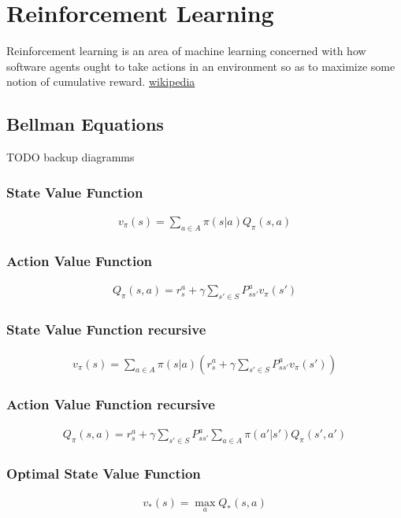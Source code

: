 \chapter{Reinforcement Learning}
Reinforcement learning is an area of machine learning concerned with how software agents ought to take actions in an environment so as to maximize some notion of cumulative reward.
\href{https://en.wikipedia.org/wiki/Reinforcement_learning}{wikipedia}

\section{Bellman Equations}
\newcommand{\qfunc}[2]{Q_\pi(#1, #2)}
\newcommand{\vfunc}[1]{v_\pi (#1)}
\newcommand{\policy}[2]{\pi (#1 | #2)}

TODO backup diagramms

\subsection{State Value Function}
\begin{align}
	\vfunc{s} = \sum_{a \in A} \policy{s}{a} \qfunc{s}{a}
\end{align}
\subsection{Action Value Function}
\begin{align}
	\qfunc{s}{a} = r_s^a + \gamma \sum_{s' \in S} P_{ss'}^a \vfunc{s'}
\end{align}
\subsection{State Value Function recursive}
\begin{align}
	\vfunc{s} = \sum_{a \in A} \policy{s}{a} (r_s^a + \gamma \sum_{s' \in S} P_{ss'}^a \vfunc{s'})
\end{align}
\subsection{Action Value Function recursive}
\begin{align}
	\qfunc{s}{a} = r_s^a + \gamma \sum_{s' \in S} P_{ss'}^a \sum_{a \in A} \policy{a'}{s'}\qfunc{s'}{a'}
\end{align}
\subsection{Optimal State Value Function}
\renewcommand{\qfunc}[2]{Q_{*}(#1, #2)}
\renewcommand{\vfunc}[1]{v_{*} (#1)}
\begin{align}
	\vfunc{s} = \max_a \qfunc{s}{a}
\end{align}
